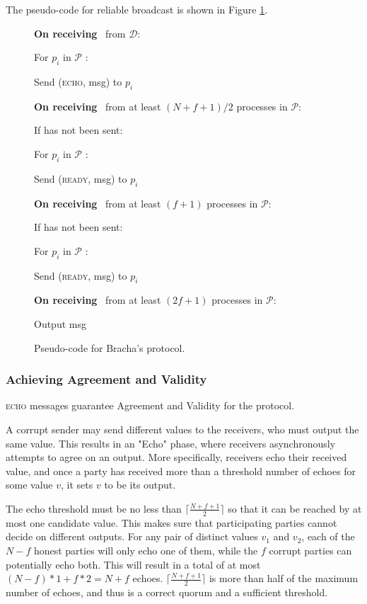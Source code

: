 The pseudo-code for reliable broadcast is shown in Figure \ref{fig:pi_code}.
\begin{figure}
    \centering
    \begin{bbox}[title={$\mathbf{\Pi}_\msf{RBC}(\mathcal{P})$}]

{\bf \color{Black} On receiving}~  from $\mathcal{D}$:

    \quad For $p_i$ in $\mathcal{P}$ :
    
        \qquad Send (\textsc{echo}, msg) to $p_i$

{\bf \color{Black} On receiving}~  from at least $(N+f+1)/2$ processes in $\mathcal{P}$:

    \quad If  has not been sent:

        \qquad For $p_i$ in $\mathcal{P}$ :
    
            \quad \qquad Send (\textsc{ready}, msg) to $p_i$

{\bf \color{Black} On receiving}~  from at least $(f+1)$ processes in $\mathcal{P}$:

    \quad If  has not been sent:

        \qquad For $p_i$ in $\mathcal{P}$ :
    
            \quad \qquad Send (\textsc{ready}, msg) to $p_i$

{\bf \color{Black} On receiving}~  from at least $(2f+1)$ processes in $\mathcal{P}$:

    \quad Output msg
\end{bbox}
    \caption{Pseudo-code for Bracha's protocol.}
    \label{fig:pi_code}
\end{figure}

\subsubsection{Achieving Agreement and Validity}
\textsc{echo} messages guarantee Agreement and Validity for the protocol.

A corrupt sender may send different values to the receivers, who must output the same value. This results in an "Echo" phase, where receivers asynchronously attempts to agree on an output. More specifically, receivers echo their received value, and once a party has received more than a threshold number of echoes for some value $v$, it sets $v$ to be its output.

The echo threshold must be no less than $\lceil \frac{N+f+1}{2} \rceil$ so that it can be reached by at most one candidate value. This makes sure that participating parties cannot decide on different outputs. For any pair of distinct values $v_1$ and $v_2$, each of the $N-f$ honest parties will only echo one of them, while the $f$ corrupt parties can potentially echo both. This will result in a total of at most $(N-f)*1+f*2=N+f$ echoes. $\lceil \frac{N+f+1}{2} \rceil$ is more than half of the maximum number of echoes, and thus is a correct quorum and a sufficient threshold.

